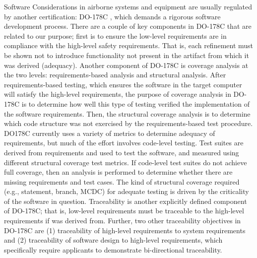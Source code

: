 Software Considerations in airborne systems and equipment are usually regulated by another certification: DO-178C \cite{DO178C}, which demands a rigorous software development process.   There are a couple of key components in DO-178C that are related to our purpose; first is to ensure the low-level requirements are in compliance with the high-level safety requirements. That is, each refinement must be shown not to introduce functionality not present in the artifact from which it was derived (adequacy).
Another component of DO-178C is coverage analysis at the two levels: requirements-based analysis and structural analysis.
After requirements-based testing, which ensures the software in the target computer will satisfy the high-level requirements, the purpose of coverage analysis in DO-178C is to determine how well this type of testing verified the implementation of the software requirements. Then, the structural coverage analysis is to determine which code structure was not exercised by the requirements-based test procedure.
DO178C currently uses a variety of metrics to determine adequacy of requirements, but much of the effort involves code-level testing.  Test suites are derived from requirements and used to test the software, and measured using different structural coverage test metrics.
If code-level test suites do not achieve full coverage, then an analysis is performed to determine whether there are missing requirements and test cases.  The kind of structural coverage required (e.g., statement, branch, MCDC) for adequate testing is driven by the criticality of the software in question.
Traceability is another explicitly defined component of DO-178C; that is, low-level requirements must be traceable to the high-level requirements if was derived from. Further, two other traceability objectives in DO-178C are (1) traceability of high-level requirements to system requirements and (2) traceability of software design to high-level requirements, which specifically require applicants to demonstrate bi-directional traceability.

